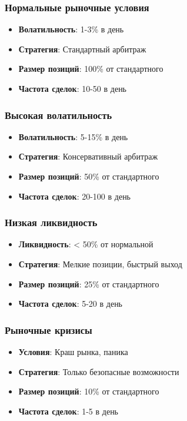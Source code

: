 \documentclass[a4paper,11pt]{article}
\begin{document}
\subsubsection{Нормальные рыночные условия}
\begin{itemize}
    \item \textbf{Волатильность}: 1-3\% в день
    \item \textbf{Стратегия}: Стандартный арбитраж
    \item \textbf{Размер позиций}: 100\% от стандартного
    \item \textbf{Частота сделок}: 10-50 в день
\end{itemize}

\subsubsection{Высокая волатильность}
\begin{itemize}
    \item \textbf{Волатильность}: 5-15\% в день
    \item \textbf{Стратегия}: Консервативный арбитраж
    \item \textbf{Размер позиций}: 50\% от стандартного
    \item \textbf{Частота сделок}: 20-100 в день
\end{itemize}

\subsubsection{Низкая ликвидность}
\begin{itemize}
    \item \textbf{Ликвидность}: < 50\% от нормальной
    \item \textbf{Стратегия}: Мелкие позиции, быстрый выход
    \item \textbf{Размер позиций}: 25\% от стандартного
    \item \textbf{Частота сделок}: 5-20 в день
\end{itemize}

\subsubsection{Рыночные кризисы}
\begin{itemize}
    \item \textbf{Условия}: Краш рынка, паника
    \item \textbf{Стратегия}: Только безопасные возможности
    \item \textbf{Размер позиций}: 10\% от стандартного
    \item \textbf{Частота сделок}: 1-5 в день
\end{itemize}
\end{document}
